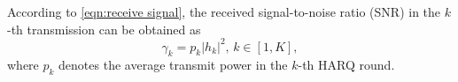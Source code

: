 \documentclass[conference]{IEEEtran}
\begin{document}
According to \eqref{eqn:receive signal}, the received signal-to-noise ratio (SNR) in the $k$-th transmission can be obtained as
\begin{equation}\label{eqn:SNR}
{\gamma _k} = {p_k}{\left| {{h_k}} \right|^2}, \, k\in [1,K], %
\end{equation}
where ${p_k}$ denotes the average transmit power in the $k$-th HARQ round. %

\end{document}
